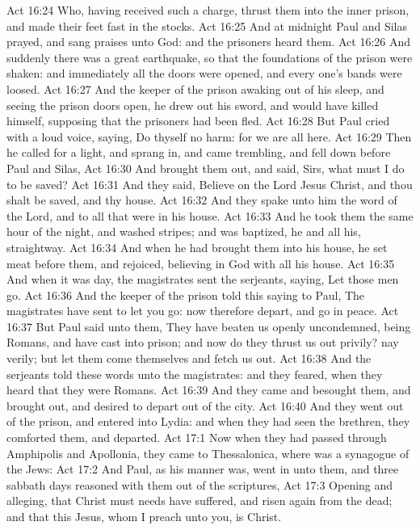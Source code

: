 \vs Act 16:24 Who, having received such a charge, thrust them into the inner prison, and made their feet fast in the stocks.
\vs Act 16:25 And at midnight Paul and Silas prayed, and sang praises unto God: and the prisoners heard them.
\vs Act 16:26 And suddenly there was a great earthquake, so that the foundations of the prison were shaken: and immediately all the doors were opened, and every one's bands were loosed.
\vs Act 16:27 And the keeper of the prison awaking out of his sleep, and seeing the prison doors open, he drew out his sword, and would have killed himself, supposing that the prisoners had been fled.
\vs Act 16:28 But Paul cried with a loud voice, saying, Do thyself no harm: for we are all here.
\vs Act 16:29 Then he called for a light, and sprang in, and came trembling, and fell down before Paul and Silas,
\vs Act 16:30 And brought them out, and said, Sirs, what must I do to be saved?
\vs Act 16:31 And they said, Believe on the Lord Jesus Christ, and thou shalt be saved, and thy house.
\vs Act 16:32 And they spake unto him the word of the Lord, and to all that were in his house.
\vs Act 16:33 And he took them the same hour of the night, and washed  stripes; and was baptized, he and all his, straightway.
\vs Act 16:34 And when he had brought them into his house, he set meat before them, and rejoiced, believing in God with all his house.
\vs Act 16:35 And when it was day, the magistrates sent the serjeants, saying, Let those men go.
\vs Act 16:36 And the keeper of the prison told this saying to Paul, The magistrates have sent to let you go: now therefore depart, and go in peace.
\vs Act 16:37 But Paul said unto them, They have beaten us openly uncondemned, being Romans, and have cast  into prison; and now do they thrust us out privily? nay verily; but let them come themselves and fetch us out.
\vs Act 16:38 And the serjeants told these words unto the magistrates: and they feared, when they heard that they were Romans.
\vs Act 16:39 And they came and besought them, and brought  out, and desired  to depart out of the city.
\vs Act 16:40 And they went out of the prison, and entered into  Lydia: and when they had seen the brethren, they comforted them, and departed.
\vs Act 17:1 Now when they had passed through Amphipolis and Apollonia, they came to Thessalonica, where was a synagogue of the Jews:
\vs Act 17:2 And Paul, as his manner was, went in unto them, and three sabbath days reasoned with them out of the scriptures,
\vs Act 17:3 Opening and alleging, that Christ must needs have suffered, and risen again from the dead; and that this Jesus, whom I preach unto you, is Christ.

